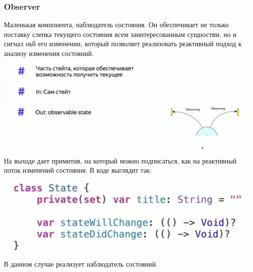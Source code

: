 \documentclass{article}
\begin{document}
    \subsubsection{Observer}
    Маленькая компонента, наблюдатель состояния. Он обеспечивает не только поставку слепка текущего состояния всем заинтересованным сущностям, но и сигнал оьб его изменении, который позволяет реализовать реактивный подход к анализу изменения состояний. 
    \newline
    \includegraphics[scale = 0.5]{pic/Снимок экрана 2023-07-30 в 22.15.22.png}
    \newline
    На выходе дает примитив, на который можно подписаться, как на реактивный поток изменений состояния. В коде выглядит так: 
    \newline
    \includegraphics[scale = 0.5]{pic/Снимок экрана 2023-07-30 в 22.16.29.png}
    \newline
    В данном случае реализует наблюдатель состояний. 
\end{document}
